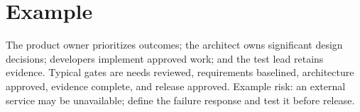 \section{Example}
The product owner prioritizes outcomes; the architect owns significant design decisions; developers implement approved work; and the test lead retains evidence. Typical gates are needs reviewed, requirements baselined, architecture approved, evidence complete, and release approved. Example risk: an external service may be unavailable; define the failure response and test it before release.
